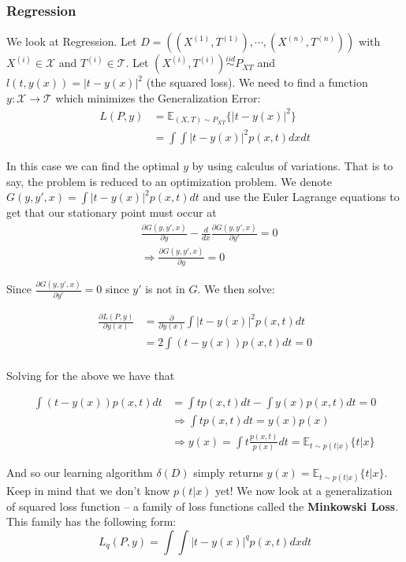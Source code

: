 \documentclass[]{article}
\theoremstyle{mattstyle}
\theoremstyle{definition}
\begin{document}
\subsubsection{Regression}
We look at Regression. Let $D=((X^{(1)},T^{(1)}), \cdots, (X^{(n)},T^{(n)}))$ with $X^{(i)} \in \mathcal{X}$ and $T^{(i)} \in \mathcal{T}$. Let $(X^{(i)},T^{(i)}) \overset{iid}{\sim} P_{XT}$ and $l(t, y(x)) = | t - y(x) |^2$ (the squared loss).
We need to find a function $y: \mathcal{X} \rightarrow \mathcal{T}$ which minimizes the Generalization Error:
\begin{align*}
L(P,y) &= \mathbb{E}_{(X,T)\sim P_{XT}}\{| t - y(x) |^2\}\\
&= \int \int | t - y(x) |^2 p(x, t) dx dt
\end{align*}

In this case we can find the optimal $y$ by using calculus of variations. That is to say, the problem is reduced to an optimization problem. We denote $G(y, y', x) = \int | t - y(x) |^2 p(x, t) dt$ and use the Euler Lagrange equations to get that our stationary point must occur at 
\begin{align*}
&\frac{\partial G(y, y', x)}{\partial y} - \frac{d}{dx}\frac{\partial G(y, y', x)}{\partial y'} = 0\\
&\Rightarrow \frac{\partial G(y, y', x)}{\partial y}=0
\end{align*}

Since $\frac{\partial G(y, y', x)}{\partial y'}=0$ since $y'$ is not in $G$. We then solve:

\begin{align*}
\frac{\partial L(P,y)}{\partial y(x)} &= \frac{\partial}{\partial y(x)}\int | t - y(x) |^2 p(x, t) dt\\
&=2 \int (t - y(x)) p(x, t) dt = 0\\
\end{align*}

Solving for the above we have that

\begin{align*}
\int (t - y(x)) p(x, t) dt &= \int t p(x, t) dt - \int y(x) p(x, t) dt = 0\\
&\Rightarrow \int t p(x, t) dt =  y(x)p(x) \\
&\Rightarrow y(x) = \int t \frac{p(x, t)}{p(x)} dt = \mathbb{E}_{t \sim p(t|x)}\{t|x\}
\end{align*}

And so our learning algorithm $\delta(D)$ simply returns $y(x) = \mathbb{E}_{t \sim p(t|x)}\{t|x\}$. Keep in mind that we don't know $p(t|x)$ yet! We now look at a generalization of squared loss function -- a family of loss functions called the \textbf{Minkowski Loss}. This family has the following form:
\begin{equation}
L_q(P,y) = \int\int |t-y(x)|^q p(x,t)dxdt
\end{equation}
\end{document}
